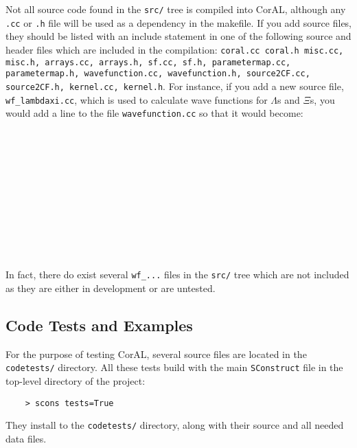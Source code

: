 \documentclass[10pt]{article}
\def\tab{\hspace*{9pt}}
\newcommand{\coral}{CorAL}
\begin{document}
Not all source code found in the {\tt src/} tree is compiled into \coral, although any {\tt *.cc} or {\tt *.h} file will be used as a dependency in the makefile. If you add source files, they should be listed with an include statement in one of the following source and header files which are included in the compilation: {\tt coral.cc \tt coral.h \tt misc.cc, misc.h, arrays.cc, arrays.h, sf.cc, sf.h, parametermap.cc, parametermap.h, wavefunction.cc, wavefunction.h, source2CF.cc, source2CF.h, kernel.cc, kernel.h}. For instance, if you add a new source file, {\tt wf\_lambdaxi.cc}, which is used to calculate wave functions for $\Lambda$s and $\Xi$s, you would add a line to the  file {\tt wavefunction.cc} so that it would become:\\
\tab {\tt \#include "wavefunction.h"}\\
\tab {\tt \#include "wfcommon.cc"}\\
\tab {\tt \#include "planewave.cc"}\\
\tab {\tt \#include "partwave.cc"}\\
\tab {\tt \#include "pipi\_phaseshifts.cc"}\\
\tab {\tt \#include "wf\_pp.cc"}\\
\tab {\tt \#include "wf\_pkplus.cc"}\\
\tab {\tt \#include "wf\_pipluspiplus.cc"}\\
\tab {\tt \#include "wf\_pipluspiminus.cc"}\\
\tab {\tt \#include "wf\_nn.cc"}\\
\tab {\tt \#include "wf\_lambdaxi.cc}\\
In fact, there do exist several {\tt wf\_...} files in the {\tt src/} tree which are not included as they are either in development or are untested.


\subsection{Code Tests and Examples}

For the purpose of testing \coral , several source files are located in the {\tt codetests/} directory.  All these tests build with the main \texttt{SConstruct} file in the top-level directory of the project:
\begin{verbatim}
    > scons tests=True
\end{verbatim}
They install to the {\tt codetests/} directory, along with their source and all needed data files.
\end{document}
